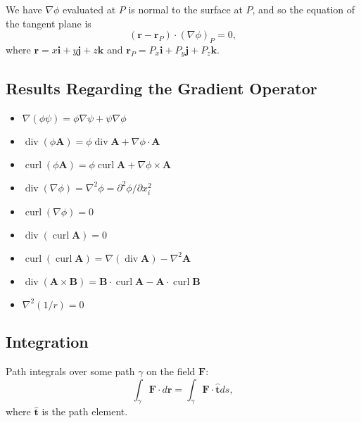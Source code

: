\documentclass[
]{article}
\theoremstyle{definition}
\theoremstyle{definition}
\begin{document}
We have \(\nabla \phi\) evaluated at \(P\) is normal to the surface at
\(P\), and so the equation of the tangent plane is
\[(\mathbf{r} - \mathbf{r}_P) \cdot (\nabla \phi)_P = 0,\] where
\(\mathbf{r} = x\mathbf{i} + y\mathbf{j} + z\mathbf{k}\) and
\(\mathbf{r}_P = P_x\mathbf{i} + P_y\mathbf{j} + P_z\mathbf{k}\).

\hypertarget{results-regarding-the-gradient-operator}{%
\subsection{Results Regarding the Gradient
Operator}\label{results-regarding-the-gradient-operator}}

\begin{itemize}
  \item \(\nabla(\phi \psi) = \phi \nabla \psi + \psi \nabla \phi\)
  \item \(\mathop{\mathrm{div}}(\phi \mathbf{A}) = \phi \mathop{\mathrm{div}}\mathbf{A} + \nabla \phi \cdot \mathbf{A}\)
  \item \(\mathop{\mathrm{curl}}(\phi\mathbf{A}) = \phi \mathop{\mathrm{curl}}\mathbf{A} + \nabla \phi \times \mathbf{A}\)
  \item \(\mathop{\mathrm{div}}(\nabla \phi) = \nabla^2 \phi = \partial^2 \phi / \partial x_i^2\)
  \item \(\mathop{\mathrm{curl}}(\nabla \phi) = 0\)
  \item \(\mathop{\mathrm{div}}(\mathop{\mathrm{curl}}\mathbf{A}) = 0\)
  \item \(\mathop{\mathrm{curl}}(\mathop{\mathrm{curl}}\mathbf{A}) = \nabla(\mathop{\mathrm{div}}\mathbf{A}) - \nabla^2 \mathbf{A}\)
  \item \(\mathop{\mathrm{div}}(\mathbf{A} \times \mathbf{B}) = \mathbf{B} \cdot \mathop{\mathrm{curl}}\mathbf{A} - 
    \mathbf{A} \cdot \mathop{\mathrm{curl}}\mathbf{B}\)
  \item \(\nabla^2 (1 / r) = 0\)
\end{itemize}

\hypertarget{integration}{%
\subsection{Integration}\label{integration}}

Path integrals over some path \(\gamma\) on the field \(\mathbf{F}\):
\[\int_\gamma \mathbf{F} \cdot d\mathbf{r} = \int_\gamma \mathbf{F} \cdot \hat{\mathbf{t}} ds,\]
where \(\hat{\mathbf{t}}\) is the path element.
\end{document}
